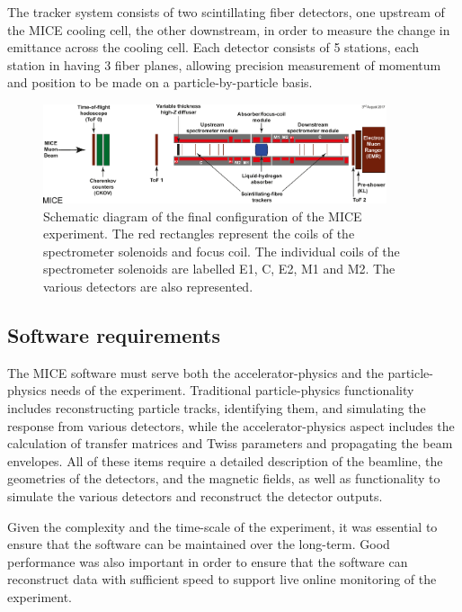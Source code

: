 \documentclass[11pt]{article}
\begin{document}
The tracker system consists of two scintillating fiber detectors, one upstream of the MICE cooling cell, the other downstream, in order to measure the change in emittance across the cooling cell. Each detector consists of 5 stations, each station in having 3 fiber planes, allowing precision measurement of momentum and position to be made on a particle-by-particle basis.


\begin{figure}[!htb]
\centering
\includegraphics[width=0.9\textwidth]{figs/Step-4-labels.pdf}
\caption{ Schematic diagram of the final configuration of the MICE experiment. The red rectangles represent the coils of the spectrometer solenoids and focus coil. The individual coils of the spectrometer solenoids are labelled E1, C, E2, M1 and M2. The various detectors are also represented.}
\label{fig:step4}
\end{figure}


\subsection{Software requirements} \label{sec:requirements}

The MICE software must serve both the accelerator-physics and the particle-physics needs of the experiment. Traditional particle-physics functionality includes reconstructing particle tracks, identifying them, and simulating the response from various detectors, while the accelerator-physics aspect includes the calculation of transfer matrices and Twiss parameters and propagating the beam envelopes. All of these items require a detailed description of the beamline, the geometries of the detectors, and the magnetic fields, as well as functionality to simulate the various detectors and reconstruct the detector outputs. 

Given the complexity and the time-scale of the experiment, it was essential to ensure that the software can be maintained over the long-term. Good performance was also important in order to ensure that the software can reconstruct data with sufficient speed to support live online monitoring of the experiment.
\end{document}
